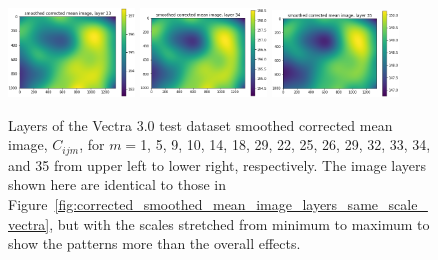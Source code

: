 \documentclass[letterpaper,11pt]{article}
\newcommand{\reffig}[1]{Figure~\ref{#1}}
\begin{document}
\begin{figure}[!ht]
\includegraphics[width=0.3\textwidth]{images/results/smoothed_corrected_mean_image_layers_vectra/smoothed_corrected_mean_image_layer_33}
\includegraphics[width=0.3\textwidth]{images/results/smoothed_corrected_mean_image_layers_vectra/smoothed_corrected_mean_image_layer_34}
\includegraphics[width=0.3\textwidth]{images/results/smoothed_corrected_mean_image_layers_vectra/smoothed_corrected_mean_image_layer_35}
\caption{\footnotesize Layers of the Vectra 3.0 test dataset smoothed corrected mean image, $C_{ijm}$, for $m=$1, 5, 9, 10, 14, 18, 29, 22, 25, 26, 29, 32, 33, 34, and 35 from upper left to lower right, respectively. The image layers shown here are identical to those in \reffig{fig:corrected_smoothed_mean_image_layers_same_scale_vectra}, but with the scales stretched from minimum to maximum to show the patterns more than the overall effects.}
\label{fig:corrected_smoothed_mean_image_layers_vectra}
\end{figure}
\end{document}
